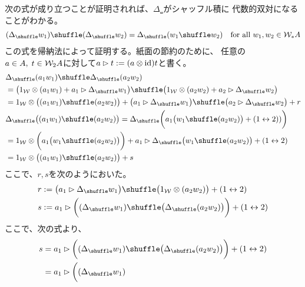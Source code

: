 {	次の式が成り立つことが証明されれば、$\Delta_\shuffle$がシャッフル積に
	代数的双対になることがわかる。
	\begin{equation*}\begin{split}
		(\Delta_\shuffle w_1)\shuffle(\Delta_\shuffle w_2)
		= \Delta_\shuffle(w_1\shuffle w_2)
		\quad\text{for all } w_1,w_2\in \W_*A
	\end{split}\end{equation*}
	この式を帰納法によって証明する。紙面の節約のために、
	任意の$a\in A,\;t\in {\ensuremath{{\mathcal{W}}}}_2A$に対して$a\rhd t:=(a\otimes{\ensuremath{\operatorname{id}}})t$と書く。
	\begin{equation*}\begin{split}
		&\Delta_\shuffle(a_1w_1)\shuffle\Delta_\shuffle(a_2w_2) \\
		&= \bigl(1_\W\otimes(a_1w_1) + a_1\rhd\Delta_\shuffle w_1\bigr)
		\shuffle\bigl(1_\W\otimes(a_2w_2) + a_2\rhd\Delta_\shuffle w_2\bigr) \\
		&= 1_\W\otimes\bigl((a_1w_1)\shuffle(a_2w_2)\bigr)
		+ \bigl(a_1\rhd\Delta_\shuffle w_1\bigr)
			\shuffle\bigl(a_2\rhd\Delta_\shuffle w_2\bigr) + r \\
		&\Delta_\shuffle\bigl((a_1w_1)\shuffle(a_2w_2)\bigr)
		= \Delta_\shuffle\biggl(a_1\bigl(w_1\shuffle(a_2w_2)\bigr)
			+ (1\swap2))\biggr) \\
		&= 1_\W\otimes\biggl(a_1\bigl(w_1\shuffle(a_2w_2)\bigr)\biggr) 
		+ a_1\rhd\Delta_\shuffle\bigl(w_1\shuffle(a_2w_2)\bigr) + (1\swap2) \\
		&= 1_\W\otimes\bigl((a_1w_1)\shuffle(a_2w_2)\bigr) + s \\
	\end{split}\end{equation*}
	ここで、$r,s$を次のようにおいた。
	\begin{equation*}\begin{split}
		r &:= \bigl(a_1\rhd\Delta_\shuffle w_1\bigr)
			\shuffle\bigl(1_\W\otimes(a_2w_2)\bigr) + (1\swap2) \\
		s &:= a_1\rhd\biggl((\Delta_\shuffle w_1)
			\shuffle\bigl(\Delta_\shuffle(a_2w_2)\bigr)\biggr) + (1\swap2) \\
	\end{split}\end{equation*}
	ここで、次の式より、
	\begin{equation*}\begin{split}
		s &= a_1\rhd\biggl((\Delta_\shuffle w_1)
			\shuffle\bigl(\Delta_\shuffle(a_2w_2)\bigr)\biggr) + (1\swap2) \\
		&= a_1\rhd\biggl((\Delta_\shuffle w_1)

\end{split}
\end{equation*}}
